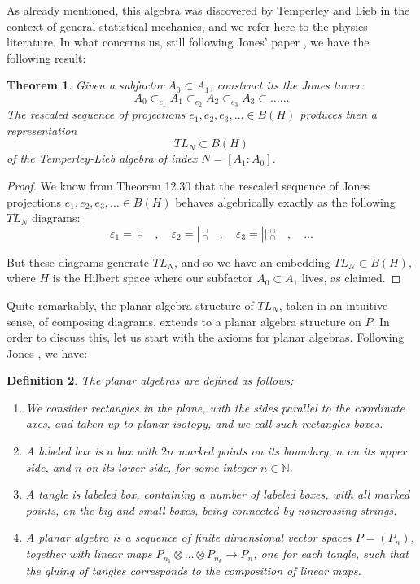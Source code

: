 \documentclass[12pt]{amsbook}
\newtheorem{theorem}{Theorem}[chapter]
\newtheorem{definition}[theorem]{Definition}
\begin{document}
As already mentioned, this algebra was discovered by Temperley and Lieb in the context of general statistical mechanics, and we refer here to the physics literature. In what concerns us, still following Jones' paper \cite{jo1}, we have the following result:


\begin{theorem}
Given a subfactor $A_0\subset A_1$, construct its the Jones tower:
$$A_0\subset_{e_1}A_1\subset_{e_2}A_2\subset_{e_3}A_3\subset\ldots\ldots$$
The rescaled sequence of projections $e_1,e_2,e_3,\ldots\in B(H)$ produces then a representation 
$$TL_N\subset B(H)$$
of the Temperley-Lieb algebra of index $N=[A_1:A_0]$.
\end{theorem}

\begin{proof}
We know from Theorem 12.30 that the rescaled sequence of Jones projections $e_1,e_2,e_3,\ldots\in B(H)$ behaves algebrically exactly as the following $TL_N$ diagrams:
$$\varepsilon_1={\ }^\cup_\cap\quad,\quad  
\varepsilon_2=|\!{\ }^\cup_\cap\quad,\quad 
\varepsilon_3=||\!{\ }^\cup_\cap\quad,\quad 
\ldots$$

But these diagrams generate $TL_N$, and so we have an embedding $TL_N\subset B(H)$, where $H$ is the Hilbert space where our subfactor $A_0\subset A_1$ lives, as claimed.
\end{proof}

Quite remarkably, the planar algebra structure of $TL_N$, taken in an intuitive sense, of composing diagrams, extends to a planar algebra structure on $P$. In order to discuss this, let us start with the axioms for planar algebras. Following Jones \cite{jo3}, we have:


\begin{definition}
The planar algebras are defined as follows:
\begin{enumerate}
\item We consider rectangles in the plane, with the sides parallel to the coordinate axes, and taken up to planar isotopy, and we call such rectangles boxes.

\item A labeled box is a box with $2n$ marked points on its boundary, $n$ on its upper side, and $n$ on its lower side, for some integer $n\in\mathbb N$.

\item A tangle is labeled box, containing a number of labeled boxes, with all marked points, on the big and small boxes, being connected by noncrossing strings.

\item A planar algebra is a sequence of finite dimensional vector spaces $P=(P_n)$, together with linear maps $P_{n_1}\otimes\ldots\otimes P_{n_k}\to P_n$, one for each tangle, such that the gluing of tangles corresponds to the composition of linear maps.
\end{enumerate}
\end{definition}
\end{document}
